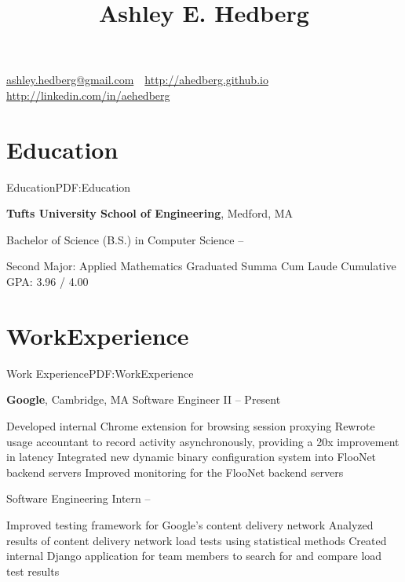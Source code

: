 \documentclass[letterpaper,MMMyyyy,nonstop]{simpleresumecv}
\newcommand{\CVAuthor}{Ashley E. Hedberg}
\newcommand{\CVWebpage}{http://ahedberg.github.io}
\begin{document}

\title{\CVAuthor}

\begin{subtitle}
\href{mailto:ashley.hedberg@gmail.com}{ashley.hedberg@gmail.com}
\,\SubBulletSymbol\,
\href{\CVWebpage}{\CVWebpage}
\,\SubBulletSymbol\,
\href{http://linkedin.com/in/aehedberg}{http://linkedin.com/in/aehedberg}
\end{subtitle}

\begin{body}


\section{Education}{Education}{PDF:Education}

\textbf{Tufts University School of Engineering}, Medford, MA

\GapNoBreak
\BulletItem
Bachelor of Science (B.S.) in Computer Science
\hfill
{} -- 
\begin{detail}
\SubBulletItem
Second Major: Applied Mathematics
\SubBulletItem
Graduated Summa Cum Laude
\SubBulletItem
Cumulative GPA: 3.96 / 4.00
\end{detail}


\section{Work\newline Experience}{Work Experience}{PDF:WorkExperience}

\textbf{Google}, Cambridge, MA
\GapNoBreak
\BulletItem
Software Engineer II
\hfill
{} -- Present
\begin{detail}
\SubBulletItem
Developed internal Chrome extension for browsing session proxying
\SubBulletItem
Rewrote usage accountant to record activity asynchronously, providing a 20x improvement in latency
\SubBulletItem
Integrated new dynamic binary configuration system into FlooNet backend servers
\SubBulletItem
Improved monitoring for the FlooNet backend servers
\end{detail}
\BulletItem
Software Engineering Intern
\hfill
{} -- 
\begin{detail}
\SubBulletItem
Improved testing framework for Google's content delivery network
\SubBulletItem
Analyzed results of content delivery network load tests using statistical methods
\SubBulletItem
Created internal Django application for team members to search for and compare load test results
\end{detail}


\end{body}
\end{document}
